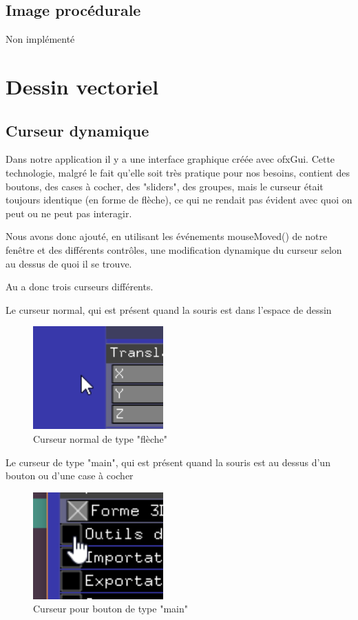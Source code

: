 \subsection{Image procédurale}
Non implémenté

\newpage

\section{Dessin vectoriel}

\subsection{Curseur dynamique}

Dans notre application il y a une interface graphique créée avec ofxGui. Cette technologie, malgré le fait qu'elle soit très pratique pour nos besoins, contient des boutons, des cases à cocher, des "sliders", des groupes, mais le curseur était toujours identique (en forme de flèche), ce qui ne rendait pas évident avec quoi on peut ou ne peut pas interagir.

Nous avons donc ajouté, en utilisant les événements mouseMoved() de notre fenêtre et des différents contrôles, une modification dynamique du curseur selon au dessus de quoi il se trouve.

Au a donc trois curseurs différents.

Le curseur normal, qui est présent quand la souris est dans l'espace de dessin

\begin{figure}[h]
	\centering
	\includegraphics[width=5cm]{fig/curseurNormal.png}
	\caption{Curseur normal de type "flèche"}
	\label{fig:test}
\end{figure}

Le curseur de type "main", qui est présent quand la souris est au dessus d'un bouton ou d'une case à cocher

\begin{figure}[h]
	\centering
	\includegraphics[width=5cm]{fig/curseurBouton.png}
	\caption{Curseur pour bouton de type "main"}
	\label{fig:test}
\end{figure}

